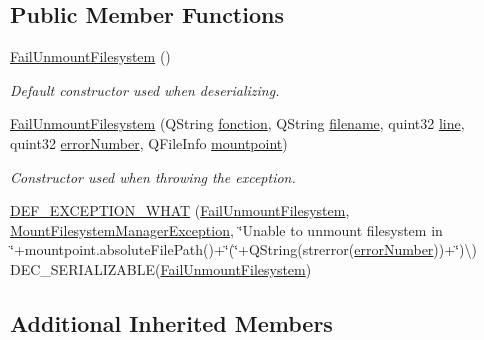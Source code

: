 \subsection*{Public Member Functions}
\begin{DoxyCompactItemize}
\item 
\hyperlink{class_gost_crypt_1_1_core_1_1_fail_unmount_filesystem_a6548ef667822dea668ab0d13e7f4a8da}{Fail\+Unmount\+Filesystem} ()
\begin{DoxyCompactList}\small\item\em Default constructor used when deserializing. \end{DoxyCompactList}\item 
\hyperlink{class_gost_crypt_1_1_core_1_1_fail_unmount_filesystem_aecbe28c793da15401efc9223ee08a3fb}{Fail\+Unmount\+Filesystem} (Q\+String \hyperlink{class_gost_crypt_1_1_gost_crypt_exception_a29b8c93d5efbb1ff369107385725a939}{fonction}, Q\+String \hyperlink{class_gost_crypt_1_1_gost_crypt_exception_a749a12375f4ba9d502623b99d8252f38}{filename}, quint32 \hyperlink{class_gost_crypt_1_1_gost_crypt_exception_abf506d911f12a4e969eea500f90bd32c}{line}, quint32 \hyperlink{class_gost_crypt_1_1_core_1_1_mount_filesystem_manager_exception_a1fb5da5dbf91cfd3e664ffb9e2aee9ee}{error\+Number}, Q\+File\+Info \hyperlink{class_gost_crypt_1_1_core_1_1_mount_filesystem_manager_exception_aaa119fba81184433a1422a122be64ca0}{mountpoint})
\begin{DoxyCompactList}\small\item\em Constructor used when throwing the exception. \end{DoxyCompactList}\item 
\hyperlink{class_gost_crypt_1_1_core_1_1_fail_unmount_filesystem_a3ca38e63eb264d6d6300626d3baf6060}{D\+E\+F\+\_\+\+E\+X\+C\+E\+P\+T\+I\+O\+N\+\_\+\+W\+H\+AT} (\hyperlink{class_gost_crypt_1_1_core_1_1_fail_unmount_filesystem}{Fail\+Unmount\+Filesystem}, \hyperlink{class_gost_crypt_1_1_core_1_1_mount_filesystem_manager_exception}{Mount\+Filesystem\+Manager\+Exception}, \char`\"{}Unable to unmount filesystem in \char`\"{}+mountpoint.\+absolute\+File\+Path()+\char`\"{}(\char`\"{}+Q\+String(strerror(\hyperlink{class_gost_crypt_1_1_core_1_1_mount_filesystem_manager_exception_a1fb5da5dbf91cfd3e664ffb9e2aee9ee}{error\+Number}))+\char`\"{})\textbackslash{}) D\+E\+C\+\_\+\+S\+E\+R\+I\+A\+L\+I\+Z\+A\+B\+LE(\hyperlink{class_gost_crypt_1_1_core_1_1_fail_unmount_filesystem}{Fail\+Unmount\+Filesystem})
\end{DoxyCompactItemize}
\subsection*{Additional Inherited Members}


